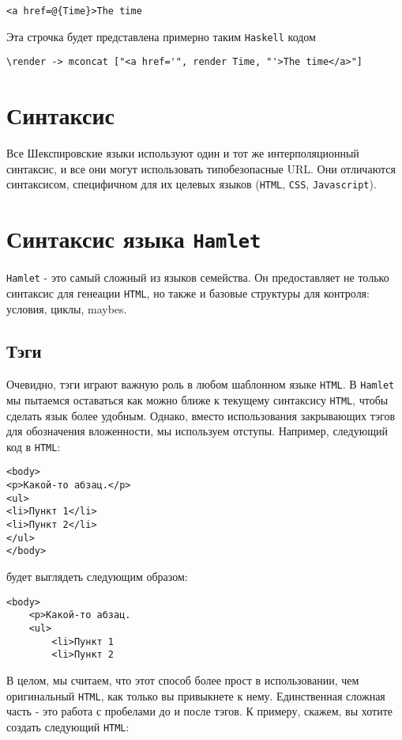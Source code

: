 \begin{lstlisting}
<a href=@{Time}>The time
\end{lstlisting}

Эта строчка будет представлена примерно таким \texttt{Haskell} кодом

\begin{lstlisting}
\render -> mconcat ["<a href='", render Time, "'>The time</a>"]
\end{lstlisting}

\section{Синтаксис}

Все Шекспировские языки используют один и тот же интерполяционный синтаксис, и
все они могут использовать типобезопасные URL. Они отличаются синтаксисом,
специфичном для их целевых языков (\texttt{HTML}, \texttt{CSS},
\texttt{Javascript}).

\section{Синтаксис языка \texttt{Hamlet}}

\texttt{Hamlet} - это самый сложный из языков семейства. Он предоставляет не
только синтаксис для генеации \texttt{HTML}, но также и базовые структуры для
контроля: условия, циклы, maybes.

\subsection{Тэги}

Очевидно, тэги играют важную роль в любом шаблонном языке \texttt{HTML}. В
\texttt{Hamlet} мы пытаемся оставаться как можно ближе к текущему синтаксису
\texttt{HTML}, чтобы сделать язык более удобным. Однако, вместо использования
закрывающих тэгов для обозначения вложенности, мы используем отступы. Например,
следующий код в \texttt{HTML}:
\begin{lstlisting}
<body>
<p>Какой-то абзац.</p>
<ul>
<li>Пункт 1</li>
<li>Пункт 2</li>
</ul>
</body>
\end{lstlisting}
будет выглядеть следующим образом:
\begin{lstlisting}
<body>
    <p>Какой-то абзац.
    <ul>
        <li>Пункт 1
        <li>Пункт 2
\end{lstlisting}

В целом, мы считаем, что этот способ более прост в использовании, чем
оригинальный \texttt{HTML}, как только вы привыкнете к нему. Единственная
сложная часть - это работа с пробелами до и после тэгов. К примеру, скажем, вы
хотите создать следующий \texttt{HTML}:

